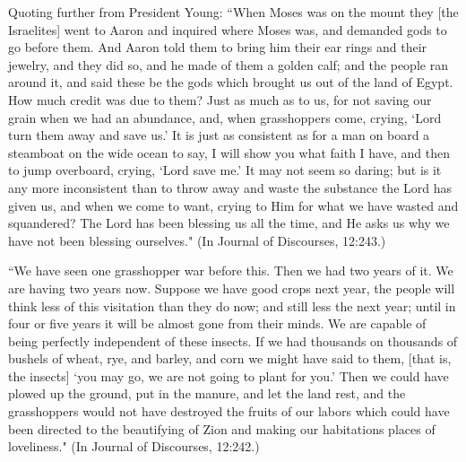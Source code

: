 Quoting further from President Young: ``When Moses was on the mount they [the Israelites] went to Aaron and inquired where Moses was, and demanded gods to go before them. And Aaron told them to bring him their ear rings and their jewelry, and they did so, and he made of them a golden calf; and the people ran around it, and said these be the gods which brought us out of the land of Egypt. How much credit was due to them? Just as much as to us, for not saving our grain when we had an abundance, and, when grasshoppers come, crying, `Lord turn them away and save us.' It is just as consistent as for a man on board a steamboat on the wide ocean to say, I will show you what faith I have, and then to jump overboard, crying, `Lord save me.' It may not seem so daring; but is it any more inconsistent than to throw away and waste the substance the Lord has given us, and when we come to want, crying to Him for what we have wasted and squandered? The Lord has been blessing us all the time, and He asks us why we have not been blessing ourselves." (In Journal of Discourses, 12:243.)

``We have seen one grasshopper war before this. Then we had two years of it. We are having two years now. Suppose we have good crops next year, the people will think less of this visitation than they do now; and still less the next year; until in four or five years it will be almost gone from their minds. We are capable of being perfectly independent of these insects. If we had thousands on thousands of bushels of wheat, rye, and barley, and corn we might have said to them, [that is, the insects] `you may go, we are not going to plant for you.' Then we could have plowed up the ground, put in the manure, and let the land rest, and the grasshoppers would not have destroyed the fruits of our labors which could have been directed to the beautifying of Zion and making our habitations places of loveliness." (In Journal of Discourses, 12:242.)